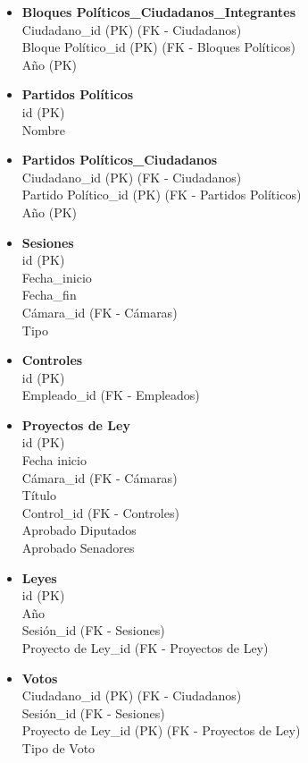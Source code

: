 \begin{itemize}
	\item \textbf{Bloques Políticos\_Ciudadanos\_Integrantes} \\
	Ciudadano\_id (PK) (FK - Ciudadanos) \\
	Bloque Político\_id (PK) (FK - Bloques Políticos)\\
	Año (PK)
	
	\item \textbf{Partidos Políticos} \\
	id (PK) \\
	Nombre 
	
	\item \textbf{Partidos Políticos\_Ciudadanos} \\
	Ciudadano\_id (PK) (FK - Ciudadanos) \\
	Partido Político\_id (PK) (FK - Partidos Políticos)\\
	Año (PK)
	
	\item \textbf{Sesiones} \\
	id (PK) \\
	Fecha\_inicio \\
	Fecha\_fin \\
	Cámara\_id (FK - Cámaras) \\
	Tipo
	
	\item \textbf{Controles} \\
	id (PK) \\
	Empleado\_id (FK - Empleados)
	
	\item \textbf{Proyectos de Ley} \\
	id (PK) \\
	Fecha inicio \\
	Cámara\_id (FK - Cámaras) \\ 
	Título \\
	Control\_id (FK - Controles) \\
	Aprobado Diputados \\
	Aprobado Senadores
	
	\item \textbf{Leyes} \\
	id (PK) \\
	Año \\
	Sesión\_id (FK - Sesiones) \\
	Proyecto de Ley\_id (FK - Proyectos de Ley)
	
	\item \textbf{Votos} \\
	Ciudadano\_id (PK) (FK - Ciudadanos) \\
	Sesión\_id  (FK - Sesiones) \\
	Proyecto de Ley\_id (PK) (FK - Proyectos de Ley) \\
	Tipo de Voto
	

\end{itemize}
